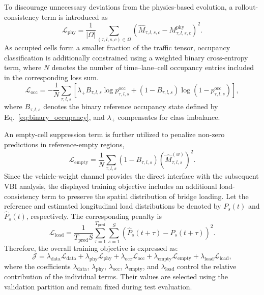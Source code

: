 \documentclass[journal]{IEEEtran}
\begin{document}
To discourage unnecessary deviations from the physics-based evolution, a rollout-consistency term is introduced as
\begin{equation}
\mathcal{L}_{\mathrm{phy}} = \frac{1}{|\Omega|}\sum_{(\tau,l,s,c)\in\Omega}\left(\widehat{M}_{\tau,l,s,c}-M_{\tau,l,s,c}^{\mathrm{phy}}\right)^2.
\end{equation}
As occupied cells form a smaller fraction of the traffic tensor, occupancy classification is additionally constrained using a weighted binary cross-entropy term, where $N$ denotes the number of time--lane--cell occupancy entries included in the corresponding loss sum.
\begin{equation}
\mathcal{L}_{\mathrm{occ}} = -\frac{1}{N}\sum_{\tau,l,s}\left[\lambda_{+}B_{\tau,l,s}\log p_{\tau,l,s}^{\mathrm{occ}}+\left(1-B_{\tau,l,s}\right)\log\left(1-p_{\tau,l,s}^{\mathrm{occ}}\right)\right],
\end{equation}
where $B_{\tau,l,s}$ denotes the binary reference occupancy state defined by Eq.~\eqref{eq:binary_occupancy}, and $\lambda_{+}$ compensates for class imbalance.

An empty-cell suppression term is further utilized to penalize non-zero predictions in reference-empty regions,
\begin{equation}
\mathcal{L}_{\mathrm{empty}} = \frac{1}{N}\sum_{\tau,l,s}\left(1-B_{\tau,l,s}\right)\left(\widehat{M}_{\tau,l,s}^{(w)}\right)^2.
\end{equation}
Since the vehicle-weight channel provides the direct interface with the subsequent VBI analysis, the displayed training objective includes an additional load-consistency term to preserve the spatial distribution of bridge loading. Let the reference and estimated longitudinal load distributions be denoted by $P_s(t)$ and $\widehat{P}_s(t)$, respectively. The corresponding penalty is
\begin{equation}
\mathcal{L}_{\mathrm{load}} = \frac{1}{T_{\mathrm{pred}}S}\sum_{\tau=1}^{T_{\mathrm{pred}}}\sum_{s=1}^{S}\left(\widehat{P}_{s}(t+\tau)-P_{s}(t+\tau)\right)^2.
\end{equation}
Therefore, the overall training objective is expressed as:
\begin{equation}
\mathcal{J} = \lambda_{\mathrm{data}}\mathcal{L}_{\mathrm{data}}+\lambda_{\mathrm{phy}}\mathcal{L}_{\mathrm{phy}}+\lambda_{\mathrm{occ}}\mathcal{L}_{\mathrm{occ}}+\lambda_{\mathrm{empty}}\mathcal{L}_{\mathrm{empty}}+\lambda_{\mathrm{load}}\mathcal{L}_{\mathrm{load}},
\end{equation}
where the coefficients $\lambda_{\mathrm{data}}$, $\lambda_{\mathrm{phy}}$, $\lambda_{\mathrm{occ}}$, $\lambda_{\mathrm{empty}}$, and $\lambda_{\mathrm{load}}$ control the relative contribution of the individual terms. Their values are selected using the validation partition and remain fixed during test evaluation.
\end{document}
